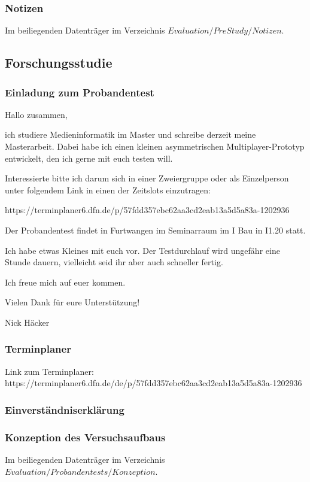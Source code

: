 \documentclass[
	12pt,
	a4paper,
	bibtotoc,
	cleardoubleempty, 
	idxtotoc,
	ngerman,
	openright
	final,
	listof=nochaptergap,
	]{scrbook}
\begin{document}
\begin{appendices}
\subsubsection{Notizen}\label{sec:append_evaluation_pre_study_notes}
Im beiliegenden Datenträger im Verzeichnis $Evaluation/PreStudy/Notizen$.

\subsection{Forschungsstudie}

\subsubsection{Einladung zum Probandentest}
Hallo zusammen,

ich studiere Medieninformatik im Master und schreibe derzeit meine Masterarbeit.
Dabei habe ich einen kleinen asymmetrischen Multiplayer-Prototyp entwickelt, den ich gerne mit euch testen will.

Interessierte bitte ich darum sich in einer Zweiergruppe oder als Einzelperson unter folgendem Link in einen der Zeitslots einzutragen:

https://terminplaner6.dfn.de/p/57fdd357ebc62aa3cd2eab13a5d5a83a-1202936

Der Probandentest findet in Furtwangen im Seminarraum im I Bau in I1.20 statt.

Ich habe etwas Kleines mit euch vor. Der Testdurchlauf wird ungefähr eine Stunde dauern, vielleicht seid ihr aber auch schneller fertig.

Ich freue mich auf euer kommen.

Vielen Dank für eure Unterstützung!

Nick Häcker

\subsubsection{Terminplaner}
Link zum Terminplaner: https://terminplaner6.dfn.de/de/p/57fdd357ebc62aa3cd2eab13a5d5a83a-1202936


\subsubsection{Einverständniserklärung}\label{sec:append_study_consent}



\subsubsection{Konzeption des Versuchsaufbaus}
Im beiliegenden Datenträger im Verzeichnis $Evaluation/Probandentests/Konzeption$.


\end{appendices}
\end{document}

